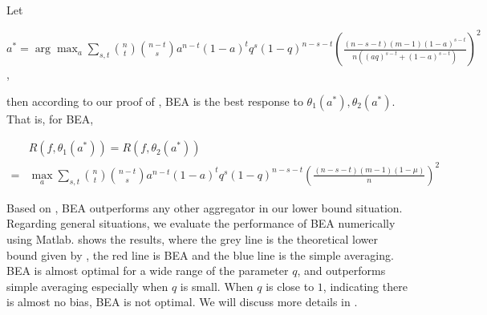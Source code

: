 Let \begin{scriptsize}
    $a^*=\arg\max_a \sum_{s,t} \binom{n}{t}\binom{n-t}{s}a^{n-t}(1-a)^tq^s(1-q)^{n-s-t}\left(\frac{(n-s-t)(m-1)(1-a)^{s-t}}{n((aq)^{s-t}+(1-a)^{s-t})}\right)^2$,
\end{scriptsize} then according to our proof of , BEA is the best response to $\theta_1(a^*),\theta_2(a^*)$. That is, for BEA,

\begin{footnotesize}

\begin{align*}
    &R(f,\theta_1(a^*))=R(f,\theta_2(a^*))\\
    =&\max_a \sum_{s,t}\binom{n}{t}\binom{n-t}{s}a^{n-t}(1-a)^tq^s(1-q)^{n-s-t}\left(\frac{(n-s-t)(m-1)(1-\mu)}{n}\right)^2
\end{align*}
\end{footnotesize}

Based on , BEA outperforms any other aggregator in our lower bound situation. Regarding general situations, we evaluate the performance of BEA numerically using Matlab.  shows the results, where the grey line is the theoretical lower bound given by , the red line is BEA and the blue line is the simple averaging. BEA is almost optimal for a wide range of the parameter $q$, and outperforms simple averaging especially when $q$ is small. When $q$ is close to $1$, indicating there is almost no bias, BEA is not optimal. We will discuss more details in .


